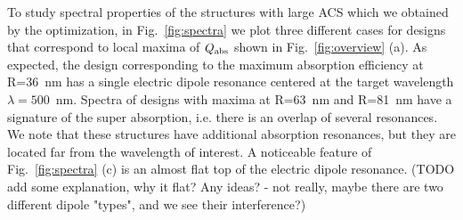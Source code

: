 \documentclass[aps,prl,twocolumn,showpacs,superscriptaddress,groupedaddress]{revtex4-1}
\begin{document}
\begin{figure}
\end{figure}
%
To study spectral properties of the structures with large ACS which we
obtained by the optimization, in Fig.~\ref{fig:spectra} we plot three
different cases for designs that correspond to local maxima of $Q_{\rm
  abs}$ shown in Fig.~\ref{fig:overview} (a).  As expected, the design
corresponding to the maximum absorption efficiency at R=36~nm has a
single electric dipole resonance centered at the target wavelength
$\lambda=500$~nm. Spectra of designs with maxima at R=63~nm and
R=81~nm have a signature of the super absorption, i.e. there is an
overlap of several resonances.  We note that these structures have
additional absorption resonances, but they are located far from the
wavelength of interest.  A noticeable feature of
Fig.~\ref{fig:spectra} (c) is an almost flat top of the electric
dipole resonance. (TODO add some explanation, why it flat? Any ideas?
- not really, maybe there are two different dipole "types", and we see
their interference?)
\end{document}
